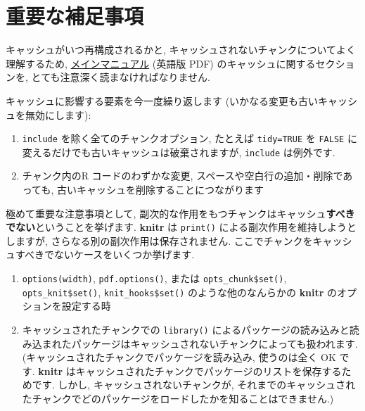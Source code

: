 \documentclass[
]{bxjsreport}
\providecommand{\tightlist}{%
  \setlength{\itemsep}{0pt}\setlength{\parskip}{0pt}}
\begin{document}
\hypertarget{ux91cdux8981ux306aux88dcux8db3ux4e8bux9805}{%
\section*{重要な補足事項}\label{ux91cdux8981ux306aux88dcux8db3ux4e8bux9805}}

キャッシュがいつ再構成されるかと,
キャッシュされないチャンクについてよく理解するため,
\href{https://github.com/yihui/knitr/releases/download/doc/knitr-manual.pdf}{メインマニュアル}
(英語版 PDF) のキャッシュに関するセクションを,
とても注意深く読まなければなりません.

キャッシュに影響する要素を今一度繰り返します
(いかなる変更も古いキャッシュを無効にします):

\begin{enumerate}
\def\labelenumi{\arabic{enumi}.}
\tightlist
\item
  \texttt{include} を除く全てのチャンクオプション, たとえば
  \texttt{tidy=TRUE} を \texttt{FALSE}
  に変えるだけでも古いキャッシュは破棄されますが, \texttt{include}
  は例外です.
\item
  チャンク内のR コードのわずかな変更,
  スペースや空白行の追加・削除であっても,
  古いキャッシュを削除することにつながります
\end{enumerate}

極めて重要な注意事項として,
副次的な作用をもつチャンクはキャッシュ\textbf{すべきでない}ということを挙げます.
\textbf{knitr} は \texttt{print()} による副次作用を維持しようとしますが,
さらなる別の副次作用は保存されません.
ここでチャンクをキャッシュすべきでないケースをいくつか挙げます.

\begin{enumerate}
\def\labelenumi{\arabic{enumi}.}
\tightlist
\item
  \texttt{options(\textquotesingle{}width\textquotesingle{})},
  \texttt{pdf.options()}, または \texttt{opts\_chunk\$set()},
  \texttt{opts\_knit\$set()}, \texttt{knit\_hooks\$set()}
  のような他のなんらかの \textbf{knitr} のオプションを設定する時
\item
  キャッシュされたチャンクでの \texttt{library()}
  によるパッケージの読み込みと読み込まれたパッケージはキャッシュされないチャンクによっても扱われます.
  (キャッシュされたチャンクでパッケージを読み込み, 使うのは全く OK です.
  \textbf{knitr}
  はキャッシュされたチャンクでパッケージのリストを保存するためです.
  しかし, キャッシュされないチャンクが,
  それまでのキャッシュされたチャンクでどのパッケージをロードしたかを知ることはできません.)
\end{enumerate}
\end{document}
